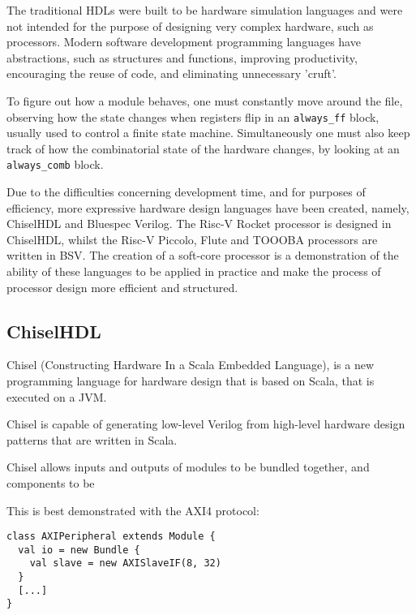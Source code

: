 \documentclass[a4paper,8pt]{report}
\begin{document}
The traditional HDLs were built to be hardware simulation languages and were not
intended for the purpose of designing very complex hardware, such as processors.
Modern software development programming languages have abstractions, such as
structures and functions, improving productivity, encouraging the reuse of
code, and eliminating unnecessary 'cruft'.

To figure out how a module behaves, one must constantly move around the file,
observing how the state changes when registers flip in an \texttt{always\_ff}
block, usually used to control a finite state machine. Simultaneously one must
also keep track of how the combinatorial state of the hardware changes, by
looking at an \texttt{always\_comb} block.

Due to the difficulties concerning development time, and for purposes of
efficiency, more expressive hardware design languages have been created, namely,
ChiselHDL and Bluespec Verilog. The Risc-V Rocket processor is designed in
ChiselHDL, whilst the Risc-V Piccolo, Flute and TOOOBA processors are written in
BSV. The creation of a soft-core processor is a demonstration of the ability of
these languages to be applied in practice and make the process of processor
design more efficient and structured.


\subsection{ChiselHDL}
Chisel (Constructing Hardware In a Scala Embedded Language), is a new
programming language for hardware design that is based on Scala, that is
executed on a JVM.

Chisel is capable of generating low-level Verilog from high-level hardware
design patterns that are written in Scala.

Chisel allows inputs and outputs of modules to be bundled together, and
components to be


This is best demonstrated with the AXI4 protocol:
\tiny
\begin{verbatim}
class AXIPeripheral extends Module {
  val io = new Bundle {
    val slave = new AXISlaveIF(8, 32)
  }
  [...]
}
\end{verbatim}
\normalsize
\end{document}

